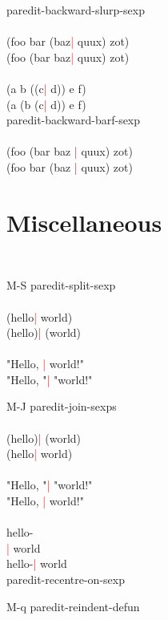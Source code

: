 \documentclass[8pt,a4paper,landscape]{extarticle}
\newcommand{\csr}{\textcolor{red}{| }}
\begin{document}
\begin{multicols}{4}
\begin{eqlist}
\longitem[C-M-$\leftarrow$] paredit-backward-slurp-sexp\\
  \\
  (foo bar (baz\csr  quux) zot)\\
  (foo (bar baz\csr  quux) zot)\\
  \\
  (a b ((c\csr  d)) e f)\\
  (a (b (c\csr  d)) e f)\\


\longitem[C-M-$\rightarrow$] paredit-backward-barf-sexp\\
  \\
  (foo (bar baz \csr quux) zot)\\
  (foo bar (baz \csr quux) zot)\\
\end{eqlist}

\section{Miscellaneous}
\begin{eqlist}
  \tt
\item[M-S] paredit-split-sexp\\
  \\
  (hello\csr  world)\\
  (hello)\csr  (world)\\
  \\
  "Hello, \csr world!"\\
  "Hello, "\csr  "world!"\\


\item[M-J] paredit-join-sexps\\
  \\
  (hello)\csr  (world)\\
  (hello\csr  world)\\
  \\
  "Hello, "\csr  "world!"\\
  "Hello, \csr world!"\\
  \\
  hello-\\
  \csr   world\\
  hello-\csr world\\

\longitem[C-c C-M-l] paredit-recentre-on-sexp

\item[M-q] paredit-reindent-defun

\end{eqlist}

\end{multicols}
\end{document}
